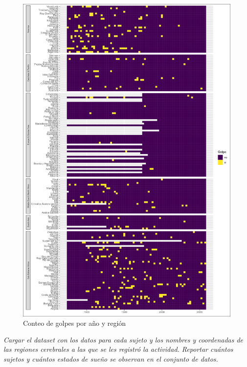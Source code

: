 \documentclass{article}
\begin{document}
\begin{figure}[H]
  \centering  
  \includegraphics[width=1\textwidth]{4_golpes_anios.png}
  \caption{Conteo de golpes por año y región\label{fig:golpes_anios}}
\end{figure}


\textit{Cargar el dataset con los datos para cada sujeto y los nombres y 
coordenadas de las regiones cerebrales a las que se les registró la actividad. 
Reportar cuántos sujetos y cuántos estados de sueño se observan en el conjunto de
datos.}

\printbibliography
\end{document}

